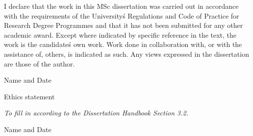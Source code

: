 \documentclass[letterpaper,10pt,conference]{ieeeconf}
\begin{document}
\begin{titlepage}
    I declare that the work in this MSc dissertation was carried out in accordance with the requirements of  the University\'s Regulations and Code of Practice for Research Degree Programmes and that it  has not been submitted for any other academic award. Except where indicated by specific  reference in the text, the work is the candidate\'s own work. Work done in collaboration with, or with the assistance of, others, is indicated as such. Any views expressed in the dissertation are those of the author.

    \begin{flushright}
    Name and Date
    \end{flushright}

    \vspace{1cm}
    {\large{Ethics statement}}

    \textit{To fill in according to the Dissertation Handbook Section 3.2.}

    \begin{flushright}
    Name and Date
    \end{flushright}
\end{titlepage}

\maketitle
\thispagestyle{empty}
\pagestyle{empty}
\end{document}
